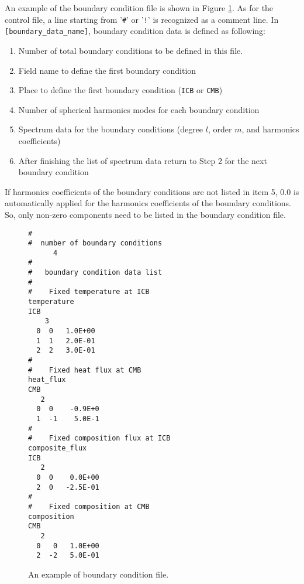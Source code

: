 An example of the boundary condition file is shown in Figure \ref{fig:boundary_file}. As for the control file, a line starting from '\verb|#|' or '\verb|!|' is recognized as a comment line. In \verb|[boundary_data_name]|, boundary condition data is defined as following:
%
\begin{enumerate}
\item  Number of total boundary conditions to be defined in this file.
\item  Field name to define the first boundary condition
\item  Place to define the first boundary condition (\verb|ICB| or \verb|CMB|)
\item  Number of spherical harmonics modes for each boundary condition
\item  Spectrum data for the boundary conditions (degree $l$, order $m$, and harmonics coefficients)
\item  After finishing the list of spectrum data return to Step 2 for the next boundary condition
\end{enumerate}
%
If harmonics coefficients of the boundary conditions are not listed in item 5, 0.0 is automatically applied for the harmonics coefficients of the boundary conditions. So, only non-zero components need to be listed in the boundary condition file.

%
\begin{figure}[htbp]
\begin{center}
\begin{verbatim}
#
#  number of boundary conditions
      4
#
#   boundary condition data list
#
#    Fixed temperature at ICB
temperature
ICB
    3
  0  0   1.0E+00
  1  1   2.0E-01
  2  2   3.0E-01
#
#    Fixed heat flux at CMB
heat_flux
CMB
   2
  0  0    -0.9E+0
  1  -1    5.0E-1
#
#    Fixed composition flux at ICB
composite_flux
ICB
   2
  0  0    0.0E+00
  2  0   -2.5E-01
#
#    Fixed composition at CMB
composition
CMB
   2
  0   0   1.0E+00
  2  -2   5.0E-01
\end{verbatim}
\end{center}
\caption{An example of boundary condition file.}
\label{fig:boundary_file}
\end{figure}
%

